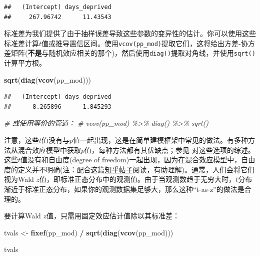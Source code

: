 \documentclass[
]{book}
\newenvironment{Shaded}{\begin{snugshade}}{\end{snugshade}}
\newcommand{\CommentTok}[1]{\textcolor[rgb]{0.56,0.35,0.01}{\textit{#1}}}
\newcommand{\FunctionTok}[1]{\textcolor[rgb]{0.13,0.29,0.53}{\textbf{#1}}}
\newcommand{\NormalTok}[1]{#1}
\newcommand{\OtherTok}[1]{\textcolor[rgb]{0.56,0.35,0.01}{#1}}
\newcommand{\SpecialCharTok}[1]{\textcolor[rgb]{0.81,0.36,0.00}{\textbf{#1}}}
\begin{document}
\begin{verbatim}
##   (Intercept) days_deprived 
##     267.96742      11.43543
\end{verbatim}

标准差为我们提供了由于抽样误差导致这些参数的变异性的估计。你可以使用这些标准差计算\(t\)值或推导置信区间。使用\texttt{vcov(pp\_mod)}提取它们，这将给出方差-协方差矩阵(\textbf{不是}与随机效应相关的那个)，然后使用\texttt{diag()}提取对角线，并使用\texttt{sqrt()}计算平方根。

\begin{Shaded}
\begin{Highlighting}[]
\FunctionTok{sqrt}\NormalTok{(}\FunctionTok{diag}\NormalTok{(}\FunctionTok{vcov}\NormalTok{(pp\_mod)))}
\end{Highlighting}
\end{Shaded}

\begin{verbatim}
##   (Intercept) days_deprived 
##      8.265896      1.845293
\end{verbatim}

\begin{Shaded}
\begin{Highlighting}[]
\CommentTok{\# 或使用等价的管道：}
\CommentTok{\# vcov(pp\_mod) \%\textgreater{}\% diag() \%\textgreater{}\% sqrt()}
\end{Highlighting}
\end{Shaded}

注意，这些\(t\)值没有与\(p\)值一起出现，这是在简单建模框架中常见的做法。有多种方法从混合效应模型中获取\(p\)值，每种方法都有其优缺点；参见 \citet{Luke_2017} 对这些选项的综述。这些\(t\)值没有和自由度(degree of freedom)一起出现，因为在混合效应模型中，自由度的定义并不明确(注：配合这篇\href{https://zhuanlan.zhihu.com/p/50048784}{知乎帖子}阅读，有助理解)。通常，人们会将它们视为Wald \(z\)值，即标准正态分布中的观测值。由于当观测数趋于无穷大时，\(t\)分布渐近于标准正态分布，如果你的观测数据集足够大，那么这种``t-as-z''的做法是合理的。

要计算Wald \(z\)值，只需用固定效应估计值除以其标准差：

\begin{Shaded}
\begin{Highlighting}[]
\NormalTok{tvals }\OtherTok{\textless{}{-}} \FunctionTok{fixef}\NormalTok{(pp\_mod) }\SpecialCharTok{/} \FunctionTok{sqrt}\NormalTok{(}\FunctionTok{diag}\NormalTok{(}\FunctionTok{vcov}\NormalTok{(pp\_mod)))}

\NormalTok{tvals}
\end{Highlighting}
\end{Shaded}
\end{document}
